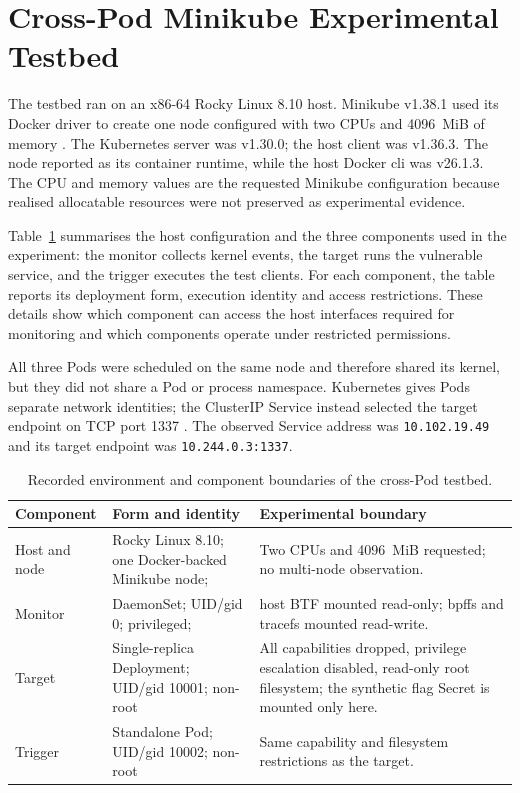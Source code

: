 \section{Cross-Pod Minikube Experimental Testbed}
\label{sec:evaluation-cross-pod-testbed}

The testbed ran on an x86-64 Rocky Linux 8.10 host. Minikube v1.38.1 used its 
Docker driver to create one node configured with two CPUs and 4096~MiB of memory
\cite{minikube_docker_driver}. The Kubernetes server was v1.30.0; the host
client was v1.36.3. The node reported  as its container
runtime, while the host Docker \gls{cli} was v26.1.3. The CPU and memory values are
the requested Minikube configuration because realised allocatable resources
were not preserved as experimental evidence.

Table~\ref{tab:evaluation-environment} summarises the host configuration
and the three components used in the experiment: the monitor collects
kernel events, the target runs the vulnerable service, and the trigger
executes the test clients. For each component, the table reports its
deployment form, execution identity and access restrictions. These details
show which component can access the host interfaces required for monitoring
and which components operate under restricted permissions.

All three Pods were scheduled on the same node and therefore shared its
kernel, but they did not share a Pod or process namespace. Kubernetes gives
Pods separate network identities; the ClusterIP Service instead selected the
target endpoint on TCP port 1337 \cite{kubernetes_pod_networking}. The observed
Service address was \texttt{10.102.19.49} and its target endpoint was
\texttt{10.244.0.3:1337}.

\begin{table}[H]
    \centering
    \small
    \renewcommand{\arraystretch}{1.14}
    \begin{tabularx}{\textwidth}{@{}p{}p{}X@{}}
        \toprule
        \textbf{Component} & \textbf{Form and identity} &
        \textbf{Experimental boundary} \\
        \midrule
        Host and node & Rocky Linux 8.10; one Docker-backed Minikube node; &
        Two CPUs and 4096~MiB requested; no multi-node observation. \\
        Monitor & DaemonSet; UID/\gls{gid} 0; privileged; & host BTF mounted
        read-only; bpffs and tracefs mounted read-write. \\
        Target & Single-replica Deployment; UID/\gls{gid} 10001; non-root & All
        capabilities dropped, privilege escalation disabled, read-only root
        filesystem; the synthetic flag Secret is mounted only here. \\
        Trigger & Standalone Pod; UID/\gls{gid} 10002; non-root & Same capability and
        filesystem restrictions as the target. \\
        \bottomrule
    \end{tabularx}
    \caption{Recorded environment and component boundaries of the cross-Pod
    testbed.}
    \label{tab:evaluation-environment}
\end{table}

